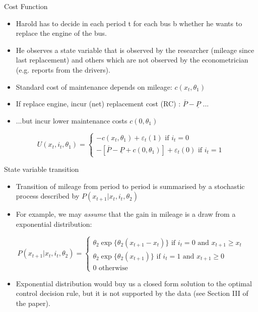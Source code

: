 \documentclass[aspectratio=169]{beamer}
\begin{document}
	\begin{frame}{Cost Function}
		\begin{itemize}
			\itemsep1em
			\item Harold has to decide in each period t for each bus b whether he wants to replace the engine of the bus.
			\item He observes a state variable that is observed by the researcher (mileage since last replacement) and others which are not observed by the econometrician (e.g. reports from the drivers).    
			\item Standard cost of maintenance depends on mileage: $c(x_t,\theta_1)$
			\item If replace engine, incur (net) replacement cost (RC) :  $\overline{P}-\underline{P}$ ...
			\item ...but incur lower maintenance costs $c(0,\theta_1)$
		\end{itemize}
		\begin{equation}
			U(x_t,i_t,\theta_1) = \begin{cases}
				-c(x_t,\theta_1) + \varepsilon_t(1) \text{ if } i_t = 0 \\
				-[\overline{P} - \underline{P}+c(0,\theta_1)] + \varepsilon_t(0) \text{ if } i_t = 1
			\end{cases}
		\end{equation}
	\end{frame}
	
	\begin{frame}{State variable transition}
		\begin{itemize}
			\item Transition of mileage from period to period is summarised by a stochastic process described by $P(x_{t+1}|x_t,i_t,\theta_2)$
			\item For example, we may \textit{assume} that  the gain in mileage is a draw from a exponential distribution:
		\end{itemize}
		\quad 
		\begin{equation}
			P(x_{t+1}|x_t,i_t,\theta_2) = \begin{cases}
				\theta_2 \exp \{\theta_2 (x_{t+1}-x_t)\} \text{ if } i_t = 0 \text{ and } x_{t+1} \geq x_t \\
				\theta_2 \exp \{\theta_2(x_{t+1})\} \text{ if } i_t = 1 \text{ and } x_{t+1} \geq 0 \\
				0 \text{ otherwise}
			\end{cases}  
		\end{equation}
		\begin{itemize}
			\item Exponential distribution would buy us a closed form solution to the optimal control decision rule, but it is not supported by the data (see Section III of the paper). 
		\end{itemize}
	\end{frame}
	
\end{document}
